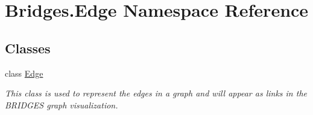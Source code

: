 \hypertarget{namespace_bridges_1_1_edge}{}\section{Bridges.\+Edge Namespace Reference}
\label{namespace_bridges_1_1_edge}
\subsection*{Classes}
\begin{DoxyCompactItemize}
\item 
class \hyperlink{class_bridges_1_1_edge_1_1_edge}{Edge}
\begin{DoxyCompactList}\small\item\em This class is used to represent the edges in a graph and will appear as links in the B\+R\+I\+D\+G\+E\+S graph visualization. \end{DoxyCompactList}\end{DoxyCompactItemize}
